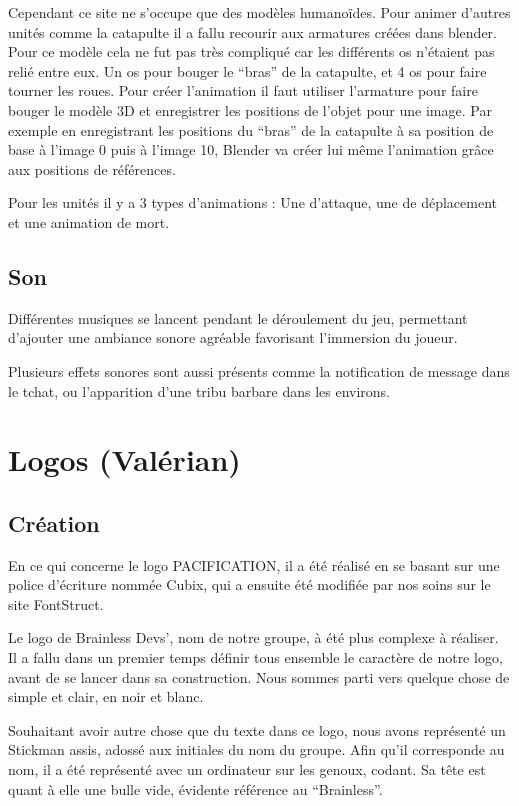 \documentclass[12pt]{report}
\begin{document}
Cependant ce site ne s’occupe que des modèles humanoïdes. Pour animer d’autres
unités comme la catapulte il a fallu recourir aux armatures créées dans blender.
Pour ce modèle cela ne fut pas très compliqué car les différents os n’étaient
pas relié entre eux.  Un os pour bouger le “bras” de la catapulte, et 4 os pour
faire tourner les roues. Pour créer l’animation il faut utiliser l’armature pour
faire bouger le modèle 3D et enregistrer les positions de l’objet pour une
image. Par exemple en enregistrant les positions du “bras” de la catapulte à sa
position de base à l’image 0 puis à l’image 10, Blender va créer lui même
l’animation grâce aux positions de références.

Pour les unités il y a 3 types d’animations : Une d’attaque, une de déplacement
et une animation de mort.

\subsection{Son}

Différentes musiques se lancent pendant le déroulement du jeu, permettant
d’ajouter une ambiance sonore agréable favorisant l’immersion du joueur.

Plusieurs effets sonores sont aussi présents comme la notification de message
dans le tchat, ou l’apparition d’une tribu barbare dans les environs.

\section{Logos (Valérian)}

\subsection{Création}

En ce qui concerne le logo PACIFICATION, il a été réalisé en se basant sur une
police d’écriture nommée Cubix, qui a ensuite été modifiée par nos soins sur le
site FontStruct.

Le logo de Brainless Devs’, nom de notre groupe, à été plus complexe à réaliser.
Il a fallu dans un premier temps définir tous ensemble le caractère de notre
logo, avant de se lancer dans sa construction. Nous sommes parti vers quelque
chose de simple et clair, en noir et blanc.

Souhaitant avoir autre chose que du texte dans ce logo, nous avons représenté un
Stickman assis, adossé aux initiales du nom du groupe. Afin qu’il corresponde au
nom, il a été représenté avec un ordinateur sur les genoux, codant. Sa tête est
quant à elle une bulle vide, évidente référence au “Brainless”.
\end{document}
